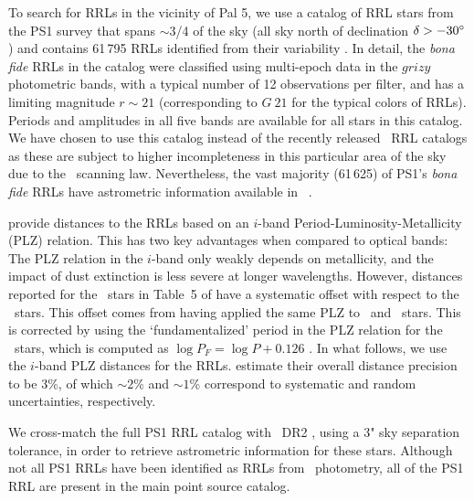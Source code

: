 \documentclass[twocolumn]{aastex63}
\begin{document}
To search for RRLs in the vicinity of Pal 5, we use a catalog of RRL stars from the PS1 survey that spans $\sim$3/4 of the sky (all sky north of declination $\delta > -30\mbox{$^\circ$}$) and contains 61\,795 RRLs identified from their variability \citep{Sesar2017b}.
In detail, the \emph{bona fide} RRLs in the catalog were classified using multi-epoch data in the $grizy$ photometric bands, with a typical number of 12 observations per filter, and has a limiting magnitude $r\sim21$ (corresponding to $G~21$ for the typical colors of RRLs).
Periods and amplitudes in all five bands are available for all stars in this catalog. 
We have chosen to use this catalog instead of the recently released \Gaia~RRL catalogs \citep[VariClassifier and Specific Object Studies][]{Holl2018, Rimoldini2018, Clementini2018} as these are subject to higher incompleteness in this particular area of the sky due to the \Gaia\ scanning law. Nevertheless, the vast majority (61\,625) of PS1's \emph{bona fide} RRLs have astrometric information available in \Gaia~.

\citet{Sesar2017b} provide distances to the RRLs based on an $i$-band Period-Luminosity-Metallicity (PLZ) relation. 
This has two key advantages when compared to optical bands: The PLZ relation in the $i$-band only weakly depends on metallicity, and the impact of dust extinction is less severe at longer wavelengths.
However, distances reported for the \rrc~stars in Table~5 of \citet{Sesar2017b} have a systematic offset with respect to the \typeab~stars. 
This offset comes from having applied the same PLZ to \typeab~and \typec~stars. 
This is corrected by using the `fundamentalized' period in the PLZ relation for the \rrc~stars, which is computed as $\log{P_F} = \log P + 0.126$ \citep[following][]{Braga2016}.
In what follows, we use the $i$-band PLZ distances for the RRLs.
\citet{Sesar2017b} estimate their overall distance precision to be 3\%, of which $\sim2$\% and $\sim1$\% correspond to systematic and random uncertainties, respectively.

We cross-match the full PS1 RRL catalog with \Gaia~DR2 \citep{Gaia:2018}, using a 3" sky separation tolerance, in order to retrieve astrometric information for these stars. 
Although not all PS1 RRLs have been identified as RRLs from \Gaia\ photometry, all of the PS1 RRL are present in the main point source catalog.


\end{document}
